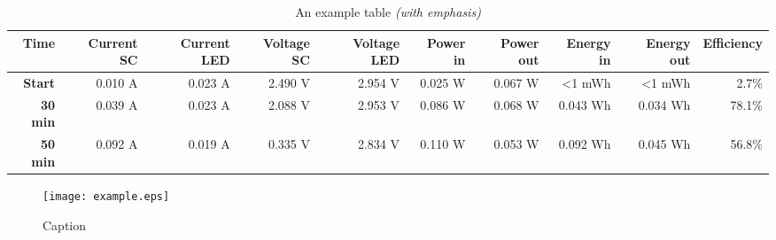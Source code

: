 \begin{table*}[h!] \centering
    \vspace*{-10pt}%
    \hspace*{-5pt}%
    \caption{An example table \emph{(with emphasis)}}
    \label{tab:table1}
    \small{%
    \begin{tabular}{@{}rrrrrrrrrr@{}}\toprule
        \textbf{Time} & \textbf{Current SC} & \textbf{Current LED} & \textbf{Voltage SC} & \textbf{Voltage LED} & \textbf{Power in} & \textbf{Power out} & \textbf{Energy in} & \textbf{Energy out}  & \textbf{Efficiency} \\ \midrule
        \textbf{Start} 		& 0.010 A &	0.023 A & 2.490 V &	2.954 V & 0.025 W &	0.067 W & <1 mWh & <1 mWh & 2.7\% \\ \hdashline
        \textbf{30 min}		& 0.039 A &	0.023 A & 2.088 V & 2.953 V & 0.086 W & 0.068 W & 0.043 Wh & 0.034 Wh & 78.1\% \\ \hdashline
        \textbf{50 min}		& 0.092 A & 0.019 A & 0.335 V & 2.834 V & 0.110 W &	0.053 W & 0.092 Wh & 0.045 Wh & 56.8\% \\
        \bottomrule
    \end{tabular}}
\end{table*}%
\vspace{10pt}

\begin{figure}[ht] \centering
    \vspace*{-5pt}
    \small{\texttt{[image: example.eps]}}
    \small\caption{Caption}
    \label{fig:fig} 
\end{figure}%

